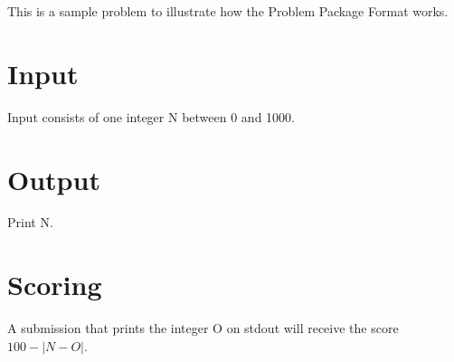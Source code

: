 This is a sample problem to illustrate how the Problem Package Format works.
\section*{Input}
Input consists of one integer N between 0 and 1000.
\section*{Output}
Print N.
\section*{Scoring}
A submission that prints the integer O on stdout will receive the score $ 100 - \lvert N - O\rvert $.
